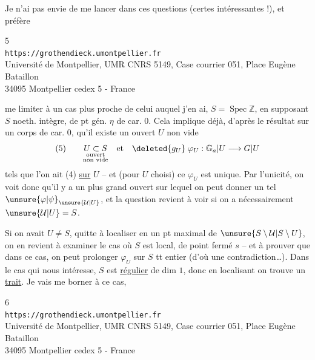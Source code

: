 Je n'ai pas envie de me lancer dans ces questions (certes intéressantes !),
et préfère

\begin{center}
\small
5\\
\texttt{https://grothendieck.umontpellier.fr}\\
Université de Montpellier, UMR CNRS 5149, Case courrier 051, Place Eugène Bataillon\\
34095 Montpellier cedex 5 - France
\end{center}


me limiter à un cas plus proche de celui auquel j'en ai, $S=\operatorname{Spec}\mathbb Z$,
en supposant $S$ noeth. intègre,  de pt gén. $\eta$
de car. $0$. Cela implique déjà, d'après le résultat sur un corps de car. $0$,
qu'il existe un ouvert $U$ non vide
\[
(5)\qquad
\underset{\substack{\text{ouvert}\\\text{non vide}}}{U\subset S}
\quad\text{et}\quad
\deleted{g_U}\;\varphi_U:\mathbb G_a\vert U\longrightarrow G\vert U
\]
tels que l'on ait (4) \uline{sur} $U$ -- et (pour $U$ choisi) ce $\varphi_U$
est unique. Par l'unicité, on voit donc qu'il y a un plus grand ouvert
 sur lequel on peut donner un tel
$\unsure{\varphi|\psi}_{\unsure{\mathcal U|U}}$,
et la question revient à voir si on a nécessairement $\unsure{\mathcal U|U}=S$.

Si on avait $U\ne S$, quitte à localiser en un pt maximal de $\unsure{S\setminus\mathcal U|S\setminus U}$,
on  en revient à examiner le cas où $S$ est local,
de point fermé $s$ -- et à  prouver
que dans ce cas, on peut prolonger $\varphi_U$ sur $S$ tt entier
(d'où une contradiction\ldots). Dans le cas qui nous intéresse, $S$ est
\uline{régulier} de dim $1$, donc en localisant on trouve un \uline{trait}.
Je vais me borner à ce cas, 

\begin{center}
\small
6\\
\texttt{https://grothendieck.umontpellier.fr}\\
Université de Montpellier, UMR CNRS 5149, Case courrier 051, Place Eugène Bataillon\\
34095 Montpellier cedex 5 - France
\end{center}

